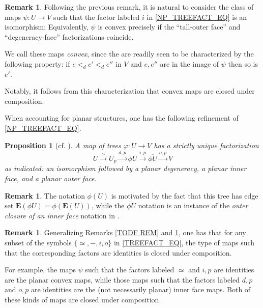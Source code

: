 \documentclass[a4paper,10pt]{article}%
\numberwithin{equation}{section}
\numberwithin{figure}{section}
\newtheorem{proposition}[equation]{Proposition}%
\theoremstyle{definition} %
\newtheorem{remark}[equation]{Remark}%
\newcommand{\1}{\ensuremath{\mathbbm 1}}%
\begin{document}
\begin{remark}\label{CNVXM REM}
	Following the previous remark, 
	it is natural to consider the class of maps
	$\psi \colon U \to V$ such that
	the factor labeled $i$ in \eqref{NP_TREEFACT_EQ}
	is an isomorphism;
	Equivalently, $\psi$ is convex precisely if
	the ``tall-outer face'' and ``degeneracy-face''
	factorizations coincide.
        
	We call these maps \textit{convex},
	since the are readily seen to be 
	characterized by the following property:
	if $e <_d e' <_d e''$
	in $V$ and $e,e''$ are in the image of $\psi$
	then so is $e'$.
	
	Notably, it follows from this characterization that convex maps are closed under composition.
\end{remark}


When accounting for planar structures,
one has the following refinement of \eqref{NP_TREEFACT_EQ}.

\begin{proposition}[{cf. \cite[Prop. 2.2]{BP_edss}}]
      \label{TREEFACT_PROP}
      A map of trees $\varphi \colon U \to V$ has a strictly unique factorization
      \begin{equation}
            \label{TREEFACT_EQ}
            U \xrightarrow{\simeq} U_p \xrightarrow{d,p} \phi U \xrightarrow{i,p} \overline{\phi U} \xrightarrow{o,p} V
      \end{equation}
      as indicated:
      an isomorphism followed by a planar degeneracy, a planar inner face, and a planar outer face.
\end{proposition}

\begin{remark}
      \label{TREEFACT_REM}
      The notation $\phi(U)$ is motivated by the fact that this tree has edge set
      $\boldsymbol{E}(\phi U) = \phi (\boldsymbol{E}(U))$,
      while the 
      $\overline{\phi U}$ notation is an instance of the 
      \emph{outer closure of an inner face}
      notation in \cite[Not. 2.14]{BP_edss}.
\end{remark}


\begin{remark}
	Generalizing Remarks \ref{TODF REM} and \ref{CNVXM REM},
	one has that for any subset 
	of the symbols $\{\simeq,-,i,o\}$
	in \eqref{TREEFACT_EQ},
	the type of maps such that 
	the corresponding factors are identities 
	is closed under composition.
	
	For example, the maps $\psi$ such that 
	the factors labeled $\simeq$ and $i,p$
	are identities are the planar convex maps,
	while those maps such that
	the factors labeled $d,p$ and $o,p$ %
	are identities are the (not necessarily planar) inner face maps.
	Both of these kinds of maps are closed under composition.	
\end{remark}
\end{document}
